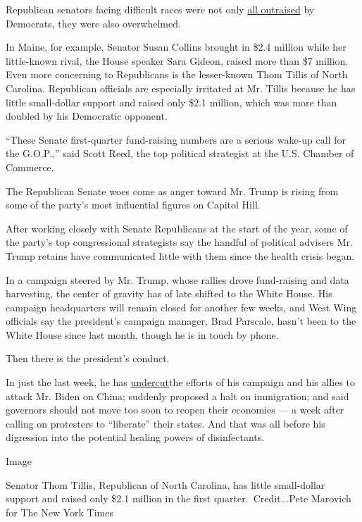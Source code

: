 Republican senators facing difficult races were not only
\href{https://www.nytimes3xbfgragh.onion/2020/04/16/us/politics/senate-races-2020-fundraising.html}{all
outraised} by Democrats, they were also overwhelmed.

In Maine, for example, Senator Susan Collins brought in \$2.4 million
while her little-known rival, the House speaker Sara Gideon, raised more
than \$7 million. Even more concerning to Republicans is the
lesser-known Thom Tillis of North Carolina. Republican officials are
especially irritated at Mr. Tillis because he has little small-dollar
support and raised only \$2.1 million, which was more than doubled by
his Democratic opponent.

``These Senate first-quarter fund-raising numbers are a serious wake-up
call for the G.O.P.,'' said Scott Reed, the top political strategist at
the U.S. Chamber of Commerce.

The Republican Senate woes come as anger toward Mr. Trump is rising from
some of the party's most influential figures on Capitol Hill.

After working closely with Senate Republicans at the start of the year,
some of the party's top congressional strategists say the handful of
political advisers Mr. Trump retains have communicated little with them
since the health crisis began.

In a campaign steered by Mr. Trump, whose rallies drove fund-raising and
data harvesting, the center of gravity has of late shifted to the White
House. His campaign headquarters will remain closed for another few
weeks, and West Wing officials say the president's campaign manager,
Brad Parscale, hasn't been to the White House since last month, though
he is in touch by phone.

Then there is the president's conduct.

In just the last week, he has
\href{https://twitter.com/maggieNYT/status/1252325824512045058}{undercut}the
efforts of his campaign and his allies to attack Mr. Biden on China;
suddenly proposed a halt on immigration; and said governors should not
move too soon to reopen their economies --- a week after calling on
protesters to ``liberate'' their states. And that was all before his
digression into the potential healing powers of disinfectants.

Image

Senator Thom Tillis, Republican of North Carolina, has little
small-dollar support and raised only \$2.1 million in the first
quarter.~Credit...Pete Marovich for The New York Times

